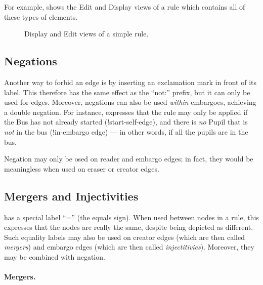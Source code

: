 For example,  shows the Edit and Display views of a rule
which contains all of these types of elements.

\begin{figure}[h]
\begin{center}
\qquad
{}
\end{center}
\caption{Display and Edit views of a simple rule.}
\end{figure}

\subsection{Negations}

Another way to forbid an edge is by inserting an exclamation mark in front of
its label. This therefore has the same effect as the ``\textsf{not:}'' prefix,
but it can only be used for edges. Moreover, negations can also be used
\emph{within} embargoes, achieving a double negation. For instance,
 expresses that the rule may only be applied if the
\textsf{Bus} has not already started (\textsf{!start}-self-edge), and there is
\emph{no} \textsf{Pupil} that is \emph{not} in the bus (\textsf{!in}-embargo
edge) --- in other words, if all the pupils are in the bus.


Negation may only be osed on reader and embargo edges; in fact, they would be
meaningless when used on eraser or creator edges.

\subsection{Mergers and Injectivities}

\Groove{} has a special label ``\textsf{=}'' (the equals sign). When used
between nodes in a rule, this expresses that the nodes are really the same,
despite being depicted as different. Such equality labels may also be used on
creator edges (which are then called \emph{mergers}) and embargo edges (which
are then called \emph{injectitivies}). Moreover, they may be combined with
negation.

\paragraph{Mergers.}

